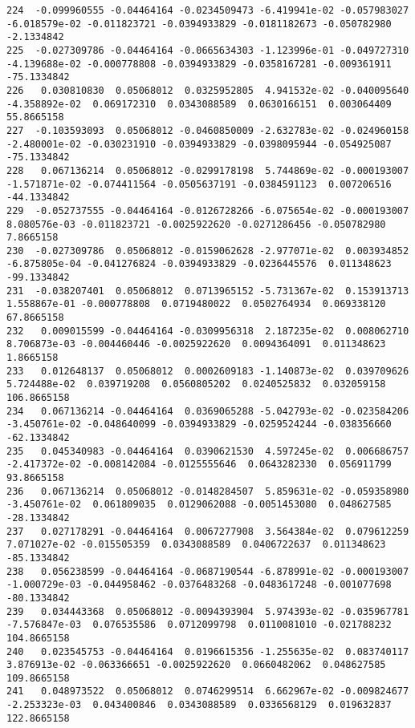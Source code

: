 \documentclass[15pt,a4paper,openright]{article}
\begin{document}
\begin{lstlisting}[language=AMPL, caption = data file]
224  -0.099960555 -0.04464164 -0.0234509473 -6.419941e-02 -0.057983027 -6.018579e-02 -0.011823721 -0.0394933829 -0.0181182673 -0.050782980   -2.1334842
225  -0.027309786 -0.04464164 -0.0665634303 -1.123996e-01 -0.049727310 -4.139688e-02 -0.000778808 -0.0394933829 -0.0358167281 -0.009361911  -75.1334842
226   0.030810830  0.05068012  0.0325952805  4.941532e-02 -0.040095640 -4.358892e-02  0.069172310  0.0343088589  0.0630166151  0.003064409   55.8665158
227  -0.103593093  0.05068012 -0.0460850009 -2.632783e-02 -0.024960158 -2.480001e-02 -0.030231910 -0.0394933829 -0.0398095944 -0.054925087  -75.1334842
228   0.067136214  0.05068012 -0.0299178198  5.744869e-02 -0.000193007 -1.571871e-02 -0.074411564 -0.0505637191 -0.0384591123  0.007206516  -44.1334842
229  -0.052737555 -0.04464164 -0.0126728266 -6.075654e-02 -0.000193007  8.080576e-03 -0.011823721 -0.0025922620 -0.0271286456 -0.050782980    7.8665158
230  -0.027309786  0.05068012 -0.0159062628 -2.977071e-02  0.003934852 -6.875805e-04 -0.041276824 -0.0394933829 -0.0236445576  0.011348623  -99.1334842
231  -0.038207401  0.05068012  0.0713965152 -5.731367e-02  0.153913713  1.558867e-01 -0.000778808  0.0719480022  0.0502764934  0.069338120   67.8665158
232   0.009015599 -0.04464164 -0.0309956318  2.187235e-02  0.008062710  8.706873e-03 -0.004460446 -0.0025922620  0.0094364091  0.011348623    1.8665158
233   0.012648137  0.05068012  0.0002609183 -1.140873e-02  0.039709626  5.724488e-02  0.039719208  0.0560805202  0.0240525832  0.032059158  106.8665158
234   0.067136214 -0.04464164  0.0369065288 -5.042793e-02 -0.023584206 -3.450761e-02 -0.048640099 -0.0394933829 -0.0259524244 -0.038356660  -62.1334842
235   0.045340983 -0.04464164  0.0390621530  4.597245e-02  0.006686757 -2.417372e-02 -0.008142084 -0.0125555646  0.0643282330  0.056911799   93.8665158
236   0.067136214  0.05068012 -0.0148284507  5.859631e-02 -0.059358980 -3.450761e-02  0.061809035  0.0129062088 -0.0051453080  0.048627585  -28.1334842
237   0.027178291 -0.04464164  0.0067277908  3.564384e-02  0.079612259  7.071027e-02 -0.015505359  0.0343088589  0.0406722637  0.011348623  -85.1334842
238   0.056238599 -0.04464164 -0.0687190544 -6.878991e-02 -0.000193007 -1.000729e-03 -0.044958462 -0.0376483268 -0.0483617248 -0.001077698  -80.1334842
239   0.034443368  0.05068012 -0.0094393904  5.974393e-02 -0.035967781 -7.576847e-03  0.076535586  0.0712099798  0.0110081010 -0.021788232  104.8665158
240   0.023545753 -0.04464164  0.0196615356 -1.255635e-02  0.083740117  3.876913e-02 -0.063366651 -0.0025922620  0.0660482062  0.048627585  109.8665158
241   0.048973522  0.05068012  0.0746299514  6.662967e-02 -0.009824677 -2.253323e-03  0.043400846  0.0343088589  0.0336568129  0.019632837  122.8665158

\end{lstlisting}
\end{document}
